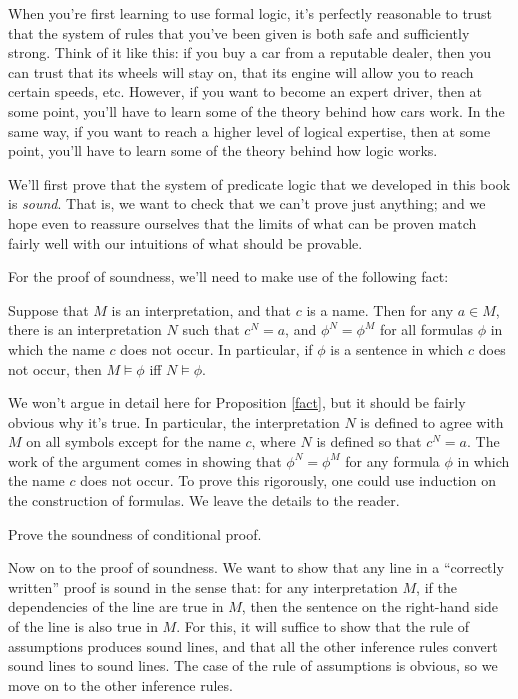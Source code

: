 When you're first learning to use formal logic, it's perfectly
reasonable to trust that the system of rules that you've been given is
both safe and sufficiently strong.  Think of it like this: if you buy
a car from a reputable dealer, then you can trust that its wheels will
stay on, that its engine will allow you to reach certain speeds, etc.
However, if you want to become an expert driver, then at some point,
you'll have to learn some of the theory behind how cars work.  In the
same way, if you want to reach a higher level of logical expertise,
then at some point, you'll have to learn some of the theory behind how
logic works.

We'll first prove that the system of predicate logic that we developed
in this book is \emph{sound}.  That is, we want to check that we can't
prove just anything; and we hope even to reassure ourselves that the
limits of what can be proven match fairly well with our intuitions of
what should be provable.

For the proof of soundness, we'll need to make use of the following
fact:
\begin{prop} Suppose that $M$ is an interpretation, and that $c$ is a
  name.  Then for any $a\in M$, there is an interpretation $N$ such
  that $c^N=a$, and $\phi ^N=\phi ^M$ for all formulas $\phi$ in which
  the name $c$ does not occur. In particular, if $\phi$ is a sentence
  in which $c$ does not occur, then $M\vDash\phi$ iff
  $N\vDash\phi$. \label{fact} \end{prop}

We won't argue in detail here for Proposition \ref{fact}, but it
should be fairly obvious why it's true.  In particular, the
interpretation $N$ is defined to agree with $M$ on all symbols except
for the name $c$, where $N$ is defined so that $c^N=a$.  The work of
the argument comes in showing that $\phi ^N=\phi ^M$ for any formula
$\phi$ in which the name $c$ does not occur.  To prove this
rigorously, one could use induction on the construction of formulas.
We leave the details to the reader.

\begin{exercise} Prove the soundness of conditional
  proof. \end{exercise}

Now on to the proof of soundness.  We want to show that any line in a
``correctly written'' proof is \gls{sound} in the sense that: for any
interpretation $M$, if the dependencies of the line are true in $M$,
then the sentence on the right-hand side of the line is also true in
$M$.  For this, it will suffice to show that the rule of assumptions
produces sound lines, and that all the other inference rules convert
sound lines to sound lines.  The case of the rule of assumptions is
obvious, so we move on to the other inference rules.

